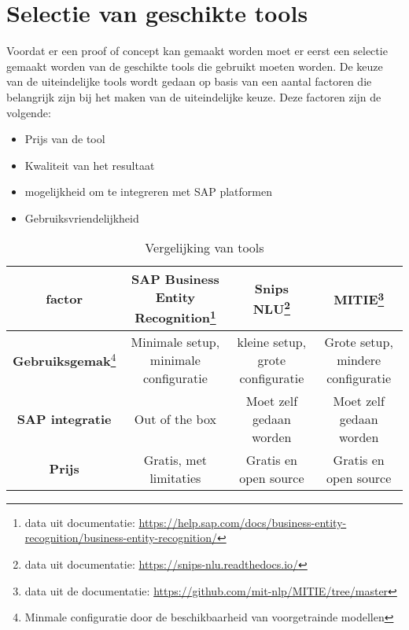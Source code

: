 \section{Selectie van geschikte tools}

Voordat er een proof of concept kan gemaakt worden moet er eerst een selectie gemaakt worden van de geschikte tools die gebruikt moeten worden. De keuze van de uiteindelijke tools wordt gedaan op basis van een aantal factoren die belangrijk zijn bij het maken van de uiteindelijke keuze.
Deze factoren zijn de volgende: 


\begin{itemize}
    \item Prijs van de tool
    \item Kwaliteit van het resultaat
    \item mogelijkheid om te integreren met SAP platformen
    \item Gebruiksvriendelijkheid
\end{itemize}

\begin{table}[h]
    \centering
    \tiny
    \begin{tabular}{|c|c|c|c|}
        \toprule
        factor & \textbf{SAP Business Entity Recognition}\footnote{data uit documentatie: \url{https://help.sap.com/docs/business-entity-recognition/business-entity-recognition/}} & \textbf{Snips NLU}\footnote{data uit documentatie: \url{https://snips-nlu.readthedocs.io/}} & \textbf{MITIE}\footnote{data uit de documentatie: \url{https://github.com/mit-nlp/MITIE/tree/master}} \\
        \midrule
        \textbf{Gebruiksgemak}\footnote{Minmale configuratie door de beschikbaarheid van voorgetrainde modellen} & Minimale setup, minimale configuratie & kleine setup, grote configuratie& Grote setup, mindere configuratie \\
        \textbf{SAP integratie} & Out of the box & Moet zelf gedaan worden & Moet zelf gedaan worden \\
        \textbf{Prijs} & Gratis, met limitaties & Gratis en open source & Gratis en open source \\
        \bottomrule
    \end{tabular}
    \caption{\label{tab:vergelijking}Vergelijking van tools} 
\end{table}

